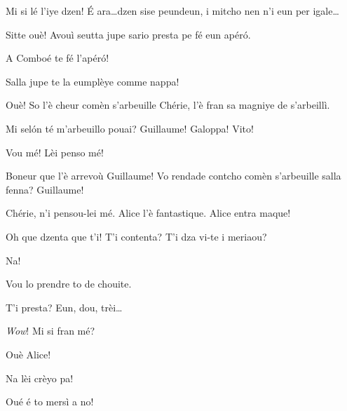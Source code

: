 \begin{drama}
{\Cheriespeaks Mi si lé l'iye dzen!  \'E ara\ldots dzen sise peundeun, i mitcho nen n'i eun per igale\ldots


\Alicespeaks Sitte ouè! Avouì seutta jupe sario presta pe fé eun apér\'o.

\Guillaumespeaks A Comboé te fé l'apér\'o!

\Cheriespeaks Salla jupe te la eumplèye comme nappa!


\Alicespeaks Ouè! So l'è cheur comèn s'arbeuille Chérie, l'è fran sa magniye de s'arbeillì.

\Cheriespeaks{} Mi sel\'on té m'arbeuillo pouai? Guillaume! Galoppa! Vito!

\Guillaumespeaks Vou mé! Lèi penso mé!


}

\Cheriespeaks{} Boneur que l'è arrevoù Guillaume! Vo rendade contcho comèn s'arbeuille salla fenna? Guillaume!


\Guillaumespeaks Chérie, n’i pensou-lei mé. Alice l'è fantastique. Alice entra maque!


\Cheriespeaks Oh que dzenta que t'i! T'i contenta? T'i dza vi-te i meriaou?

\Alicespeaks Na!

\Cheriespeaks Vou lo prendre to de chouite.


\Cheriespeaks{} T'i presta? Eun, dou, trèi\ldots


\Alicespeaks \textit{Wow}! Mi si fran mé?

\Guillaumespeaks Ouè Alice!

\Alicespeaks Na lèi crèyo pa!

\Cheriespeaks Oué é to mersì a no!


\end{drama}
